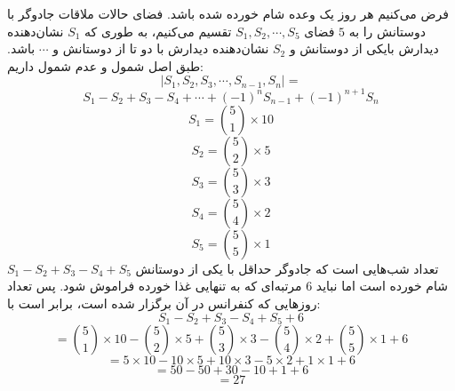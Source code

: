\p
فرض می‌کنیم هر روز یک وعده شام خورده شده باشد. فضای حالات ملاقات جادوگر با دوستانش را به 
$5$
فضای
$S_1, S_2, \cdots, S_5$
تقسیم می‌کنیم، به طوری که 
$S_1$
نشان‌دهنده دیدارش بایکی از دوستانش و
$S_2$
نشان‌دهنده دیدارش با دو تا از دوستانش و
$\cdots$
باشد.
طبق اصل شمول و عدم شمول داریم:
$$|S_1, S_2, S_3, \cdots, S_{n-1}, S_n| =$$
$$S_1 - S_2 + S_3 - S_4 + \cdots + (-1)^nS_{n-1} + (-1)^{n+1}S_n $$
$$S_1 = \binom{5}{1} \times 10$$
$$S_2 = \binom{5}{2} \times 5$$
$$S_3 = \binom{5}{3} \times 3$$
$$S_4 = \binom{5}{4} \times 2$$
$$S_5 = \binom{5}{5} \times 1$$
$S_1 - S_2 + S_3 - S_4 + S_5$
تعداد شب‌هایی است که جادوگر حداقل با یکی از دوستانش شام خورده است اما نباید
$6$
مرتبه‌ای که به تنهایی غذا خورده فراموش شود. پس تعداد روزهایی که کنفرانس در آن برگزار شده است، برابر است با:
$$S_1 - S_2 + S_3 - S_4 + S_5 + 6$$
$$= \binom{5}{1} \times 10 - \binom{5}{2} \times 5 + \binom{5}{3} \times 3 - \binom{5}{4} \times 2 + \binom{5}{5} \times 1 + 6$$
$$= 5 \times 10 - 10 \times 5 + 10 \times 3 - 5 \times 2 + 1 \times 1 + 6$$
$$= 50 - 50 + 30 -10 + 1 + 6$$
$$= 27$$